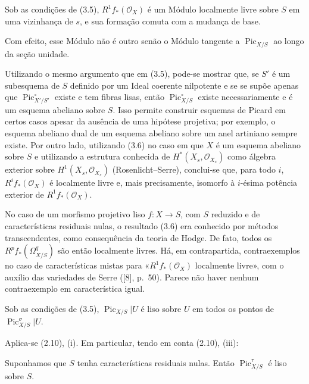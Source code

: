 Sob as condições de (3.5),
$R^1f_*(\mathcal O_X)$ é um Módulo localmente livre sobre $S$ em uma
vizinhança de $s$, e sua formação comuta com a mudança de base.

Com efeito, esse Módulo não é outro senão o Módulo tangente a
$\operatorname{Pic}_{X/S}$ ao longo da seção unidade.

 Utilizando o mesmo argumento que em (3.5), pode-se
mostrar que, se $S'$ é um subesquema de $S$ definido por um Ideal coerente
nilpotente e se se supõe apenas que $\operatorname{Pic}_{X'/S'}^\circ$ existe e
tem fibras lisas, então $\operatorname{Pic}_{X/S}^\circ$ existe
necessariamente e é um esquema abeliano sobre $S$. Isso permite construir
esquemas de Picard em certos casos apesar da ausência de uma hipótese
projetiva; por exemplo, o esquema abeliano dual de um esquema abeliano sobre um
anel artiniano sempre existe. Por outro lado, utilizando (3.6) no caso em que
$X$ é um esquema abeliano sobre $S$ e utilizando a estrutura conhecida de
$H^*(X_s,\mathcal O_{X_s})$ como álgebra exterior sobre
$H^1(X_s,\mathcal O_{X_s})$ (Rosenlicht--Serre), conclui-se que, para todo
$i$, $R^if_*(\mathcal O_X)$ é localmente livre e, mais precisamente, isomorfo
à $i$-ésima potência exterior de $R^1f_*(\mathcal O_X)$.

 No caso de um morfismo projetivo liso
$f:X\longrightarrow S$, com $S$ reduzido e de características residuais
nulas, o resultado (3.6) era conhecido por métodos transcendentes, como
consequência da teoria de Hodge. De fato, todos os
$R^pf_*(\Omega^q_{X/S})$ são então localmente livres. Há, em contrapartida,
contraexemplos
no caso de características mistas para «$R^1f_*(\mathcal O_X)$ localmente
livre», com o auxílio das variedades de Serre ([8], p.~50). Parece não haver
nenhum contraexemplo em característica igual.

 Sob as condições de (3.5),
$\operatorname{Pic}_{X/S}|U$ é liso sobre $U$ em todos os pontos de
$\operatorname{Pic}_{X/S}^\sigma|U$.

Aplica-se (2.10), (i). Em particular, tendo em conta (2.10), (iii):

 Suponhamos que $S$ tenha características residuais
nulas. Então $\operatorname{Pic}_{X/S}^\tau$ é liso sobre $S$.

